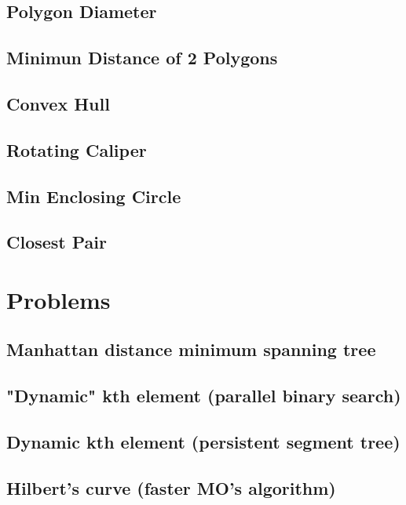 \documentclass[a4paper,10pt,twocolumn,oneside]{article}
\begin{document}
\subsection{Polygon Diameter}

\subsection{Minimun Distance of 2 Polygons}

\subsection{Convex Hull}

\subsection{Rotating Caliper}

\subsection{Min Enclosing Circle}

\subsection{Closest Pair}

\section{Problems}
\subsection{Manhattan distance minimum spanning tree}

\subsection{"Dynamic" kth element (parallel binary search)}

\subsection{Dynamic kth element (persistent segment tree)}

\subsection{Hilbert's curve (faster MO's algorithm)}

\end{document}
